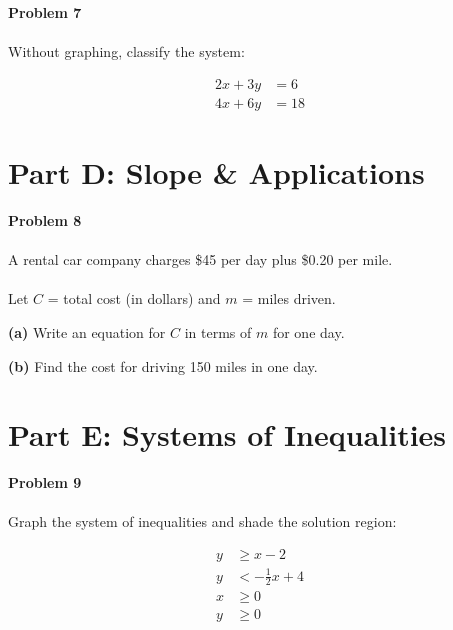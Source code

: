 \documentclass[12pt]{article}
\begin{document}
            \newpage

            \textbf{Problem 7}\\\\
            Without graphing, classify the system:

            \begin{align*}
                2x + 3y &= 6\\
                4x + 6y &= 18
            \end{align*}

            \newpage

        \section*{Part D: Slope \& Applications}

            \textbf{Problem 8}\\\\
            A rental car company charges \$45 per day plus \$0.20 per mile.\\\\
            Let $C$ = total cost (in dollars) and $m$ = miles driven.

            \vspace{0.5cm}

            \textbf{(a)} Write an equation for $C$ in terms of $m$ for one day.

            \vspace{4cm}

            \textbf{(b)} Find the cost for driving 150 miles in one day.

            \newpage

        \section*{Part E: Systems of Inequalities}

            \textbf{Problem 9}\\\\
            Graph the system of inequalities and shade the solution region:

            \begin{align*}
                y &\geq x - 2\\
                y &< -\frac{1}{2}x + 4\\
                x &\geq 0\\
                y &\geq 0
            \end{align*}
\end{document}
